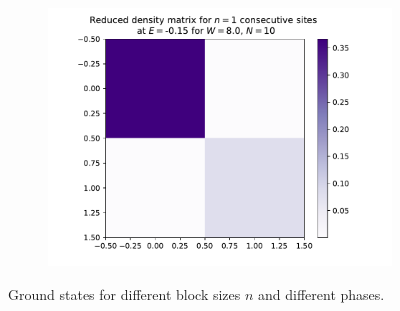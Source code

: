 \documentclass[reprint,amsmath,amssymb,aps,prb]{revtex4-2}
\begin{document}
\begin{center}
\begin{figure}[h!]
\begin{subfigure}[c]{0.45\textwidth}
		\end{subfigure}
		\begin{subfigure}[c]{0.45\textwidth}
			\includegraphics[width=\linewidth]{../results/groundstates/N10n1_trainingset_groundstate_Wmax8.0}
		\end{subfigure}
		\caption{Ground states for different block sizes $n$ and different phases.}
		\label{fig:groundstates_loc}
\end{figure}
\end{center}
\end{document}
